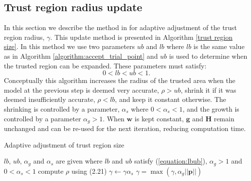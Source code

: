 \documentclass[letterpaper,12pt,titlepage,oneside,final]{book}
\begin{document}
	\subsection{Trust region radius update}
	
	In this section we describe the method in \cite{Fletcher.1987} for adaptive adjustment of the trust region radius, $\gamma$. This update method is presented in Algorithm \ref{trust region size}. In this method we use two parameters $ub$ and $lb$ where $lb$ is the same value as in Algorithm \ref{algorithm:accept_trial_point} and $ub$ is used to determine when the trusted region can be expanded. These parameters must satisfy:
	\begin{equation}
	0 < lb < ub < 1.
	\label{equation:lbub}
	\end{equation}
	Conceptually this algorithm increases the radius of the trusted area when the model at the previous step is deemed very accurate, $\rho > ub$, shrink it if it was deemed insufficiently accurate, $\rho < lb$, and keep it constant otherwise. The shrinking is controlled by a parameter, $\alpha_{s}$ where $0 < \alpha_{s} < 1$, and the growth is controlled by a parameter $\alpha_{g} > 1$. When $\mathbf{w}$ is kept constant, $\mathbf{g}$ and $\mathbf{H}$ remain unchanged and can be re-used for the next iteration, reducing computation time. 
	\begin{algorithm}
		\caption{Adaptive adjustment of trust region size}\label{trust region size}
		\begin{algorithmic}[1]
			\State $lb$, $ub$, $\alpha_{g}$ and $\alpha_{s}$ are given where $lb$ and $ub$ satisfy (\ref{equation:lbub}), $\alpha_{g} > 1$ and $0 < \alpha_{s} < 1$
			\State compute $\rho$ using (2.21)
			\State $\gamma \gets \gamma\alpha_{s}$
			\State $\gamma = \max(\gamma,\alpha_{g}||\mathbf{p}||)$
			\EndIf
		\end{algorithmic}
	\end{algorithm}
	
\end{document}
